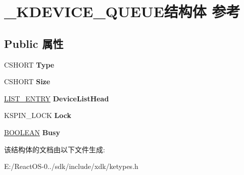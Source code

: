 \hypertarget{struct___k_d_e_v_i_c_e___q_u_e_u_e}{}\section{\+\_\+\+K\+D\+E\+V\+I\+C\+E\+\_\+\+Q\+U\+E\+U\+E结构体 参考}
\label{struct___k_d_e_v_i_c_e___q_u_e_u_e}
\subsection*{Public 属性}
\begin{DoxyCompactItemize}
\item 
\mbox{\label{struct___k_d_e_v_i_c_e___q_u_e_u_e_a7ac9819697d693e29c2e577632977c19}} 
C\+S\+H\+O\+RT {\bfseries Type}
\item 
\mbox{\label{struct___k_d_e_v_i_c_e___q_u_e_u_e_a808e74a71ecb66effddb72ccc77945a7}} 
C\+S\+H\+O\+RT {\bfseries Size}
\item 
\mbox{\label{struct___k_d_e_v_i_c_e___q_u_e_u_e_a3679d44ffb706274d6f2c4a788bf11f2}} 
\hyperlink{struct___l_i_s_t___e_n_t_r_y}{L\+I\+S\+T\+\_\+\+E\+N\+T\+RY} {\bfseries Device\+List\+Head}
\item 
\mbox{\label{struct___k_d_e_v_i_c_e___q_u_e_u_e_a6ee723cdd732d39313e47f60776e6d90}} 
K\+S\+P\+I\+N\+\_\+\+L\+O\+CK {\bfseries Lock}
\item 
\mbox{\label{struct___k_d_e_v_i_c_e___q_u_e_u_e_a03ed2b614b7dde7bad0a48ad88a90d70}} 
\hyperlink{_processor_bind_8h_a112e3146cb38b6ee95e64d85842e380a}{B\+O\+O\+L\+E\+AN} {\bfseries Busy}
\end{DoxyCompactItemize}


该结构体的文档由以下文件生成\+:\begin{DoxyCompactItemize}
\item 
E\+:/\+React\+O\+S-\/0../sdk/include/xdk/ketypes.\+h\end{DoxyCompactItemize}

